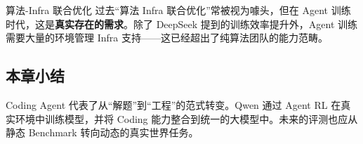 \begin{knowledgebox}{算法-Infra 联合优化}
过去``算法 Infra 联合优化''常被视为噱头，但在 Agent 训练时代，这是\textbf{真实存在的需求}。除了 DeepSeek 提到的训练效率提升外，Agent 训练需要大量的环境管理 Infra 支持——这已经超出了纯算法团队的能力范畴。
\end{knowledgebox}

\subsection{本章小结}

Coding Agent 代表了从``解题''到``工程''的范式转变。Qwen 通过 Agent RL 在真实环境中训练模型，并将 Coding 能力整合到统一的大模型中。未来的评测也应从静态 Benchmark 转向动态的真实世界任务。

